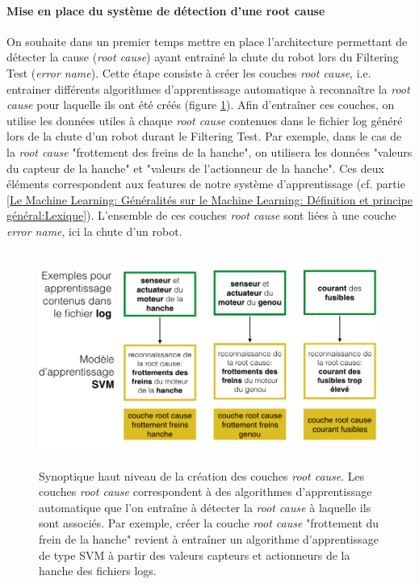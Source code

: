 \paragraph{Mise en place du système de détection d'une root cause}
On souhaite dans un premier temps mettre en place l'architecture permettant de détecter la cause (\emph{root cause}) ayant entrainé la chute du robot lors du Filtering Test (\emph{error name}). Cette étape consiste à créer les couches \emph{root cause}, i.e. entrainer différents algorithmes d'apprentissage automatique à reconnaître la \emph{root cause} pour laquelle ils ont été créés (figure \ref{fig:Creation des couches root cause}). Afin d'entraîner ces couches, on utilise les données utiles à chaque \emph{root cause} contenues dans le fichier log généré lors de la chute d'un robot durant le Filtering Test. Par exemple, dans le cas de la \emph{root cause} "frottement des freins de la hanche", on utilisera les données "valeurs du capteur de la hanche" et "valeurs de l'actionneur de la hanche". Ces deux éléments correspondent aux features de notre système d'apprentissage (cf. partie \ref{Le Machine Learning: Généralités sur le Machine Learning: Définition et principe général:Lexique}). L'ensemble de ces couches \emph{root cause} sont liées à une couche \emph{error name}, ici la chute d'un robot.

\begin{figure}[h]
	\centering\includegraphics[height=7cm]{images/synoptique_root.png}
	\caption[Création des couches root cause]{Synoptique haut niveau de la création des couches \emph{root cause}. Les couches \emph{root cause} correspondent à des algorithmes d'apprentissage automatique que l'on entraîne à détecter la \emph{root cause} à laquelle ils sont associés. Par exemple, créer la couche \emph{root cause} "frottement du frein de la hanche" revient à entraîner un algorithme d'apprentissage de type SVM à partir des valeurs capteurs et actionneurs de la hanche des fichiers logs.}
	\label{fig:Creation des couches root cause}
\end{figure}

